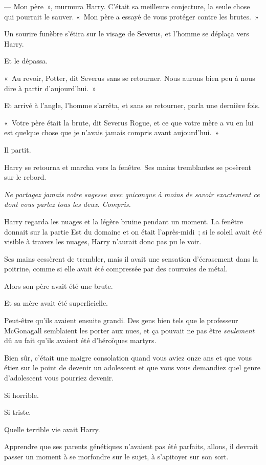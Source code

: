 --- Mon père~», murmura Harry.
C'était sa meilleure conjecture, la seule chose qui pourrait le sauver.
«~Mon père a essayé de vous protéger contre les brutes.~»

Un sourire funèbre s'étira sur le visage de Severus, et l'homme se déplaça vers Harry.

Et le dépassa.

«~Au revoir, Potter, dit Severus sans se retourner.
Nous aurons bien peu à nous dire à partir d'aujourd'hui.~»

Et arrivé à l'angle, l'homme s'arrêta, et sans se retourner, parla une dernière fois.

«~Votre père était la brute, dit Severus Rogue, et ce que votre mère a vu en lui est quelque chose que je n'avais jamais compris avant aujourd'hui.~»

Il partit.

Harry se retourna et marcha vers la fenêtre.
Ses mains tremblantes se posèrent sur le rebord.

\emph{Ne partagez jamais votre sagesse avec quiconque à moins de savoir exactement ce dont vous parlez tous les deux.
Compris.}

Harry regarda les nuages et la légère bruine pendant un moment.
La fenêtre donnait sur la partie Est du domaine et on était l'après-midi~; si le soleil avait été visible à travers les nuages, Harry n'aurait donc pas pu le voir.

Ses mains cessèrent de trembler, mais il avait une sensation d'écrasement dans la poitrine, comme si elle avait été compressée par des courroies de métal.

Alors son père avait été une brute.

Et sa mère avait été superficielle.

Peut-être qu'ils avaient ensuite grandi.
Des gens bien tels que le professeur McGonagall semblaient les porter aux nues, et ça pouvait ne pas être \emph{seulement} dû au fait qu'ils avaient été d'héroïques martyrs.

Bien sûr, c'était une maigre consolation quand vous aviez onze ans et que vous étiez sur le point de devenir un adolescent et que vous vous demandiez quel genre d'adolescent vous pourriez devenir.

Si horrible.

Si triste.

Quelle terrible vie avait Harry.

Apprendre que ses parents génétiques n'avaient pas été parfaits, allons, il devrait passer un moment à se morfondre sur le sujet, à s'apitoyer sur son sort.

